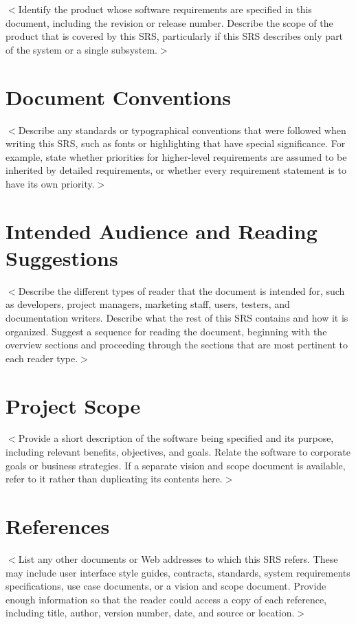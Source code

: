 \documentclass{scrreprt}
\begin{document}
$<$Identify the product whose software requirements are specified in this 
document, including the revision or release number. Describe the scope of the 
product that is covered by this SRS, particularly if this SRS describes only 
part of the system or a single subsystem.$>$

\section{Document Conventions}
$<$Describe any standards or typographical conventions that were followed when 
writing this SRS, such as fonts or highlighting that have special significance.  
For example, state whether priorities  for higher-level requirements are assumed 
to be inherited by detailed requirements, or whether every requirement statement 
is to have its own priority.$>$

\section{Intended Audience and Reading Suggestions}
$<$Describe the different types of reader that the document is intended for, 
such as developers, project managers, marketing staff, users, testers, and 
documentation writers. Describe what the rest of this SRS contains and how it is 
organized. Suggest a sequence for reading the document, beginning with the 
overview sections and proceeding through the sections that are most pertinent to 
each reader type.$>$

\section{Project Scope}
$<$Provide a short description of the software being specified and its purpose, 
including relevant benefits, objectives, and goals. Relate the software to 
corporate goals or business strategies. If a separate vision and scope document 
is available, refer to it rather than duplicating its contents here.$>$

\section{References}
$<$List any other documents or Web addresses to which this SRS refers. These may 
include user interface style guides, contracts, standards, system requirements 
specifications, use case documents, or a vision and scope document. Provide 
enough information so that the reader could access a copy of each reference, 
including title, author, version number, date, and source or location.$>$
\end{document}
